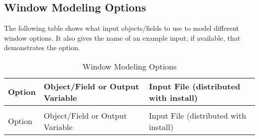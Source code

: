 \subsection{Window Modeling Options}\label{window-modeling-options}

The following table shows what input objects/fields to use to model different window options. It also gives the name of an example input, if available, that demonstrates the option.

\begin{longtable}[c]{p{2.0in}p{2.0in}p{2.0in}}
\caption{Window Modeling Options \label{table:window-modeling-options}} \tabularnewline
\toprule
Option & Object/Field or Output Variable & Input File (distributed with install) \tabularnewline
\midrule
\endfirsthead

\caption[]{Window Modeling Options} \tabularnewline
\toprule
Option & Object/Field or Output Variable & Input File (distributed with install) \tabularnewline
\midrule
\endhead


\end{longtable}

